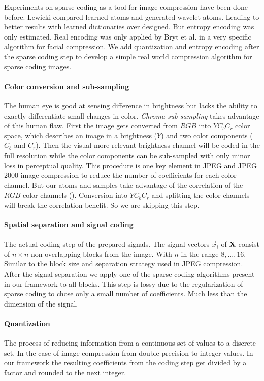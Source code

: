 Experiments on sparse coding as a tool for image compression have been done
before\cite{Lewicki1999,Murray2006}. Lewicki compared learned atoms and
generated wavelet atoms. Leading to better results with learned dictionaries
over designed. But entropy encoding was only estimated. 
Real encoding was only applied by Bryt et al.\cite{Bryt2008} in
a very specific algorithm for facial compression. We add quantization and
entropy encoding after the sparse coding step to develop a simple real world
compression algorithm for sparse coding images.


\paragraph{Color conversion and sub-sampling} The human eye is good at sensing
difference in brightness but lacks the ability to exactly differentiate small
changes in color. \emph{Chroma sub-sampling} takes advantage of this human flaw.
First the image gets converted from $RGB$ into $YC_bC_r$ color space, which
describes an image in a brightness ($Y$) and two color components ($C_b$ and
$C_r$). Then the visual more relevant brightness channel will be coded in
the full resolution while the color components can be sub-sampled with
only minor loss in perceptual quality. This procedure is one key element in JPEG
and JPEG 2000 image compression to reduce the number of coefficients for each
color channel. 
But our atoms and samples take advantage of the correlation of the $RGB$ color
channels (). Conversion into $YC_bC_r$ and
splitting the color channels will break the correlation benefit. So we are
skipping this step.  

\paragraph{Spatial separation and signal coding}
The actual coding step of the prepared signals. The signal vectors $\vec{x}_i$
of $\boldsymbol{\mathrm{X}}$ consist of $n \times n$ non overlapping blocks from the image.
With $n$ in the range $8,...,16$. Similar to the block size and separation
strategy used in JPEG compression. After the signal separation we apply one
of the sparse coding algorithms present in our framework to all blocks. This
step is lossy due to the regularization of sparse coding to chose only a small
number of coefficients. Much less than the dimension of the signal. 

\paragraph{Quantization}  The process of reducing information from a
continuous set of values to a discrete set. In the case of image compression
from double precision to integer values. In our framework the resulting
coefficients from the coding step get divided by a factor and rounded to the
next integer.  

